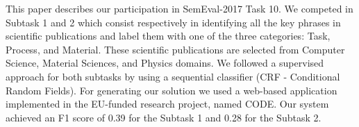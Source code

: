 This paper describes our participation in SemEval-2017 Task 10. We competed in Subtask 1 and 2 which consist respectively in identifying all the key phrases in scientific publications and label them with one of the three categories: Task, Process, and Material. These scientific publications are selected from Computer Science, Material Sciences, and Physics domains. We followed a supervised approach for both subtasks by using a sequential classifier (CRF - Conditional Random Fields). For generating our solution we used a web-based application implemented in the EU-funded research project, named CODE. Our system achieved an F1 score of 0.39 for the Subtask 1 and 0.28 for the Subtask 2.
